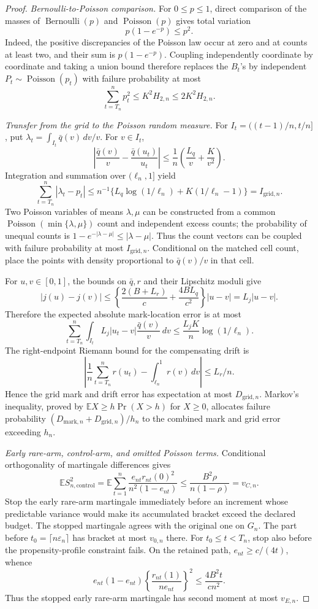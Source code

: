 \documentclass{article}
\begin{document}
\begin{proof}
\emph{Bernoulli-to-Poisson comparison.}
For \(0\leq p\leq1\), direct comparison of the masses of
\(\operatorname{Bernoulli}(p)\) and \(\operatorname{Poisson}(p)\) gives total variation
\[
 p(1-e^{-p})\leq p^2.
\]
Indeed, the positive discrepancies of the Poisson law occur at zero and at counts at least two, and their sum is \(p(1-e^{-p})\).  Coupling independently coordinate by coordinate and taking a union bound therefore replaces the \(B_t\)'s by independent \(P_t\sim\operatorname{Poisson}(p_t)\) with failure probability at most
\[
 \sum_{t=T_n}^n p_t^2\leq K^2H_{2,n}\leq2K^2H_{2,n}.
\]

\emph{Transfer from the grid to the Poisson random measure.}
For \(I_t=((t-1)/n,t/n]\), put
\(\lambda_t=\int_{I_t}\bar q(v)\,dv/v\).  For \(v\in I_t\),
\[
 \left|\frac{\bar q(v)}v-\frac{\bar q(u_t)}{u_t}\right|
 \leq \frac1n\left(\frac{L_q}{v}+\frac K{v^2}\right).
\]
Integration and summation over \((\ell_n,1]\) yield
\[
 \sum_{t=T_n}^n|\lambda_t-p_t|
 \leq n^{-1}\{L_q\log(1/\ell_n)+K(1/\ell_n-1)\}
 =I_{\mathrm{grid},n}.
\]
Two Poisson variables of means \(\lambda,\mu\) can be constructed from a common
\(\operatorname{Poisson}(\min\{\lambda,\mu\})\) count and independent excess counts; the probability of unequal counts is
\(1-e^{-|\lambda-\mu|}\leq|\lambda-\mu|\).
Thus the count vectors can be coupled with failure probability at most
\(I_{\mathrm{grid},n}\).  Conditional on the matched cell count, place the points with density proportional to \(\bar q(v)/v\) in that cell.

For \(u,v\in[0,1]\), the bounds on \(\bar q,r\) and their Lipschitz moduli give
\[
 |j(u)-j(v)|
 \leq\left\{\frac{2(B+L_r)}c+\frac{4BL_q}{c^2}\right\}|u-v|
 =L_j|u-v|.
\]
Therefore the expected absolute mark-location error is at most
\[
 \sum_{t=T_n}^n\int_{I_t}L_j|u_t-v|\frac{\bar q(v)}v\,dv
 \leq \frac{L_jK}{n}\log(1/\ell_n).
\]
The right-endpoint Riemann bound for the compensating drift is
\[
 \left|\frac1n\sum_{t=T_n}^nr(u_t)-\int_{\ell_n}^1r(v)\,dv\right|
 \leq L_r/n.
\]
Hence the grid mark and drift error has expectation at most
\(D_{\mathrm{grid},n}\).  Markov's inequality, proved by
\(\mathbb E X\geq h\Pr(X>h)\) for \(X\geq0\), allocates failure probability
\((D_{\mathrm{mark},n}+D_{\mathrm{grid},n})/h_n\) to the combined mark and grid error exceeding \(h_n\).

\emph{Early rare-arm, control-arm, and omitted Poisson terms.}
Conditional orthogonality of martingale differences gives
\[
 \mathbb E S_{n,\mathrm{control}}^2
 =\mathbb E\sum_{t=1}^n
 \frac{e_{nt}r_{nt}(0)^2}{n^2(1-e_{nt})}
 \leq\frac{B^2\rho}{n(1-\rho)}
 =v_{C,n}.
\]
Stop the early rare-arm martingale immediately before an increment whose predictable variance would make its accumulated bracket exceed the declared budget.  The stopped martingale agrees with the original one on \(G_n\).  The part before
\(t_0=\lceil n\varepsilon_n\rceil\) has bracket at most \(v_{0,n}\) there.  For \(t_0\leq t<T_n\), stop also before the propensity-profile constraint fails.  On the retained path, \(e_{nt}\geq c/(4t)\), whence
\[
 e_{nt}(1-e_{nt})
 \left\{\frac{r_{nt}(1)}{n e_{nt}}\right\}^2
 \leq\frac{4B^2t}{cn^2}.
\]
Thus the stopped early rare-arm martingale has second moment at most \(v_{E,n}\).


\end{proof}
\end{document}
